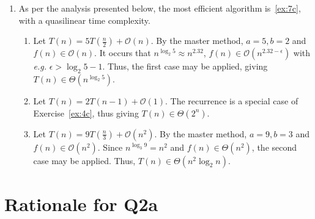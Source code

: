 \documentclass[12pt]{article}
\begin{document}
\begin{enumerate}
\begin{enumerate}
    \end{enumerate}
    \item As per the analysis presented below, the most efficient algorithm is~\ref{ex:7c}, with a quasilinear time complexity.
    \begin{enumerate}
        \item Let $T(n) = 5T(\frac{n}{2}) + \mathcal{O}(n)$. By the master method, $a = 5, b = 2$ and $f(n) \in \mathcal{O}(n)$. It occurs that $n^{\log_{2} 5} \approx n^{2.32}$, $f(n) \in \mathcal{O}(n^{2.32 - \epsilon})$ with \emph{e.g.} $\epsilon > \log_{2} 5 - 1$. Thus, the first case may be applied, giving $T(n) \in \Theta(n^{\log_{2} 5})$.
        \item Let $T(n) = 2T(n - 1) + \mathcal{O}(1)$. The recurrence is a special case of Exercise~\ref{ex:4c}, thus giving $T(n) \in \Theta(2^{n})$.
        \item\label{ex:7c} Let $T(n) = 9T(\frac{n}{3}) + \mathcal{O}(n^{2})$. By the master method, $a = 9, b = 3$ and $f(n) \in \mathcal{O}(n^{2})$. Since $n^{\log_{3} 9} = n^{2}$ and $f(n) \in \Theta(n^{2})$, the second case may be applied. Thus, $T(n) \in \Theta(n^{2} \log_{2} n)$.
    \end{enumerate}
\end{enumerate}

\appendix

\section{Rationale for Q2a}
\end{document}
